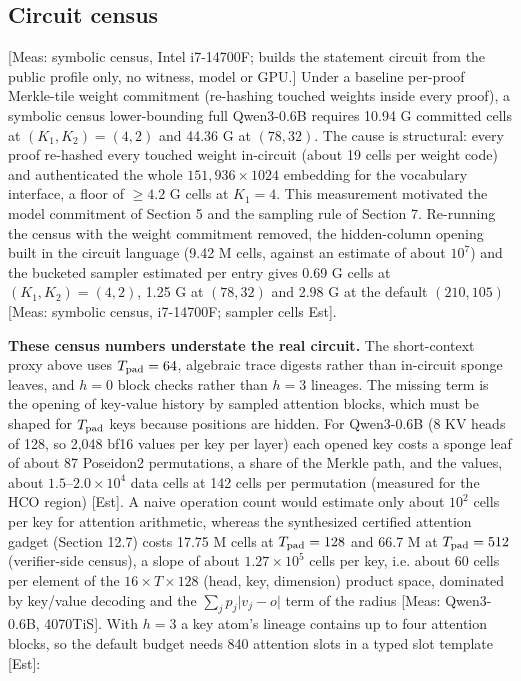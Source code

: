\documentclass[10pt]{article}
\begin{document}
\subsection{Circuit census}
[Meas: symbolic census, Intel i7-14700F; builds the statement circuit from the public profile only, no witness, model or GPU.] Under a baseline per-proof Merkle-tile weight commitment (re-hashing touched weights inside every proof), a symbolic census lower-bounding full Qwen3-0.6B requires 10.94 G committed cells at $(K_1,K_2)=(4,2)$ and 44.36 G at $(78,32)$. The cause is structural: every proof re-hashed every touched weight in-circuit (about 19 cells per weight code) and authenticated the whole $151{,}936\times1024$ embedding for the vocabulary interface, a floor of $\ge4.2$ G cells at $K_1=4$. This measurement motivated the model commitment of Section 5 and the sampling rule of Section 7. Re-running the census with the weight commitment removed, the hidden-column opening built in the circuit language (9.42 M cells, against an estimate of about $10^7$) and the bucketed sampler estimated per entry gives 0.69 G cells at $(K_1,K_2)=(4,2)$, 1.25 G at $(78,32)$ and 2.98 G at the default $(210,105)$ [Meas: symbolic census, i7-14700F; sampler cells Est].

\textbf{These census numbers understate the real circuit.} The short-context proxy above uses $T_{\rm pad}=64$, algebraic trace digests rather than in-circuit sponge leaves, and $h=0$ block checks rather than $h=3$ lineages. The missing term is the opening of key-value history by sampled attention blocks, which must be shaped for $T_{\rm pad}$ keys because positions are hidden. For Qwen3-0.6B (8 KV heads of 128, so 2,048 bf16 values per key per layer) each opened key costs a sponge leaf of about 87 Poseidon2 permutations, a share of the Merkle path, and the values, about $1.5$--$2.0\times10^4$ data cells at 142 cells per permutation (measured for the HCO region) [Est]. A naive operation count would estimate only about $10^2$ cells per key for attention arithmetic, whereas the synthesized certified attention gadget (Section 12.7) costs 17.75 M cells at $T_{\rm pad}=128$ and 66.7 M at $T_{\rm pad}=512$ (verifier-side census), a slope of about $1.27\times10^5$ cells per key, i.e. about 60 cells per element of the $16\times T\times128$ (head, key, dimension) product space, dominated by key/value decoding and the $\sum_jp_j\lvert v_j-o\rvert$ term of the radius [Meas: Qwen3-0.6B, 4070TiS]. With $h=3$ a key atom's lineage contains up to four attention blocks, so the default budget needs 840 attention slots in a typed slot template [Est]:
\end{document}
